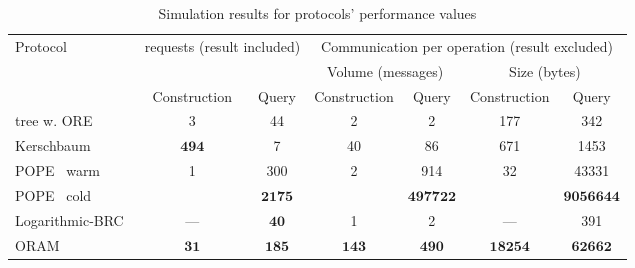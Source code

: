 \begin{table*}[t!]
	\centering
	\caption{Simulation results for protocols' performance values}\label{tbl:protocols-result}
	\begin{tabular}{ l c c c c c c }

		\toprule

		\multirow{3}{*}{Protocol}				& \multicolumn{2}{c}{\multirow{2}{*}{{\IO} requests (result included)}}	& \multicolumn{4}{c}{Communication per operation (result excluded)}					\\
		\rule{0pt}{10pt}						& 									&									& \multicolumn{2}{c}{Volume (messages)}	& \multicolumn{2}{c}{Size (bytes)}			\\ \cline{2-3} \cline{4-7}
		\rule{0pt}{10pt}						& Construction						& Query								& Construction			& Query			& Construction			& Query				\\

		\toprule

		{\BPlus} tree w. ORE					& 3									& 44								& 2						& 2				& 177 					& 342				\\

		\midrule

		Kerschbaum~\cite{florian-protocol}		& $\bm{494}$						& 7									& 40					& 86			& 671					& 1453				\\

		\midrule

		POPE~\cite{pope} warm					& \multirow{2}{*}{1}				& 300								& \multirow{2}{*}{2}	& 914			& \multirow{2}{*}{32}	& 43331				\\

		POPE~\cite{pope} cold					& 									& $\bm{2175}$						& 						& $\bm{497722}$	& 						& $\bm{9056644}$	\\

		\midrule

		Logarithmic-BRC~\cite{practical-range-search}	& $\textbf{---}$					& $\bm{40}$							& 1						& 2				& $\textbf{---}$		& 391				\\

		\midrule

		ORAM									& $\bm{31}$							& $\bm{185}$						& $\bm{143}$			& $\bm{490}$	& $\bm{18254}$			& $\bm{62662}$		\\

		\bottomrule

	\end{tabular}
\end{table*}
